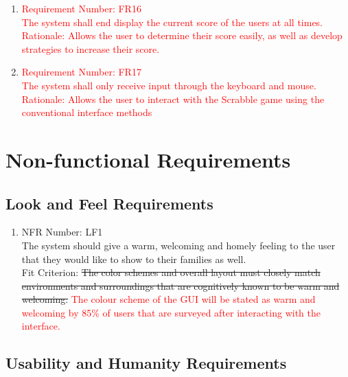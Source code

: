 \documentclass[12pt, titlepage]{article}
\begin{document}
\begin{enumerate}
    \item
    \textcolor{red}{Requirement Number: FR16} \\
    \textcolor{red}{The system shall end display the current score of the users at all times.}\\
    \textcolor{red}{Rationale: Allows the user to determine their score easily, as well as develop strategies to increase their score.}\\
    
    \item
    \textcolor{red}{Requirement Number: FR17} \\
    \textcolor{red}{The system shall only receive input through the keyboard and mouse.}\\
    \textcolor{red}{Rationale: Allows the user to interact with the Scrabble game using the conventional interface methods}\\
\end{enumerate}

\section{Non-functional Requirements}

\subsection{Look and Feel Requirements}
\begin{enumerate}
    \item NFR Number: LF1\\ %
    The system should give a warm, welcoming and homely feeling to the user that they would like to show to their families as well.\\
    Fit Criterion: \sout{The color schemes and overall layout must closely match environments and surroundings that are cognitively known to be warm and welcoming.} \textcolor{red}{The colour scheme of the GUI will be stated as warm and welcoming by 85\% of users that are surveyed after interacting with the interface.}
\end{enumerate}

\subsection{Usability and Humanity Requirements}
\end{document}
